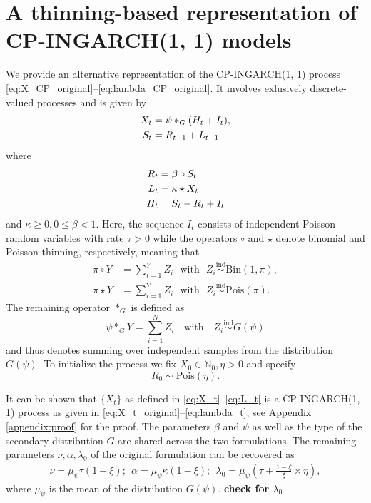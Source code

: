 \documentclass[10pt,a4paper]{article}
\begin{document}
\section{A thinning-based representation of CP-INGARCH(1, 1) models}

We provide an alternative representation of the CP-INGARCH(1, 1) process \eqref{eq:X_CP_original}--\eqref{eq:lambda_CP_original}. It involves exlusively discrete-valued processes and is given by
\begin{align}
X_t & = \psi *_G (H_t + I_t),\label{eq:X_t}\\
S_t & = R_{t - 1} + L_{t - 1}\label{eq:juv_t}
\end{align}
where
\begin{align}
R_t & = \beta \circ S_{t}\label{eq:R_t}\\
L_t & = \kappa \star X_t \label{eq:L_t}\\
H_t & = S_t - R_t + I_t
\end{align}
and $\kappa \geq 0, 0 \leq \beta <1$. Here, the sequence $I_t$ consists of independent Poisson random variables with rate $\tau > 0$ while the operators $\circ$ and $\star$ denote binomial and Poisson thinning, respectively, meaning that
\begin{align*}
\pi \circ Y & = \sum_{i = 1}^Y Z_i \ \ \ \text{with} \ \ \ Z_i \stackrel{\text{ind}}{\sim} \text{Bin}(1, \pi), \\
\pi \star Y & = \sum_{i = 1}^Y Z_i \ \ \ \text{with} \ \ \ Z_i \stackrel{\text{ind}}{\sim} \text{Pois}(\pi).
\end{align*}
The remaining operator $*_G$ is defined as
$$
\psi *_G Y = \sum_{i = 1}^N Z_i \ \ \ \text{ with } \ \ \ Z_i \stackrel{\text{ind}}{\sim} G(\psi)
$$
and thus denotes summing over independent samples from the distribution $G(\psi)$. To initialize the process we fix $X_0 \in \mathbb{N}_0, \eta > 0$ and specify
$$
R_0 \sim \text{Pois}\left(\eta \right).
$$

It can be shown that $\{X_t\}$ as defined in \eqref{eq:X_t}--\eqref{eq:L_t} is a CP-INGARCH(1, 1) process as given in \eqref{eq:X_t_original}--\eqref{eq:lambda_t}, see Appendix \ref{appendix:proof} for the proof. The parameters $\beta$ and $\psi$ as well as the type of the secondary distribution $G$ are shared across the two formulations. The remaining parameters $\nu, \alpha, \lambda_0$ of the original formulation can be recovered as
\begin{align*}
\nu = \mu_\psi \tau(1 - \xi);\ \
\alpha = \mu_\psi \kappa(1 - \xi);\ \
\lambda_0 = \mu_\psi \left(\tau + \frac{1 - \xi}{\xi} \times \eta\right),
\end{align*}
where $\mu_\psi$ is the mean of the distribution $G(\psi)$. \textbf{check for $\lambda_0$}
\end{document}
